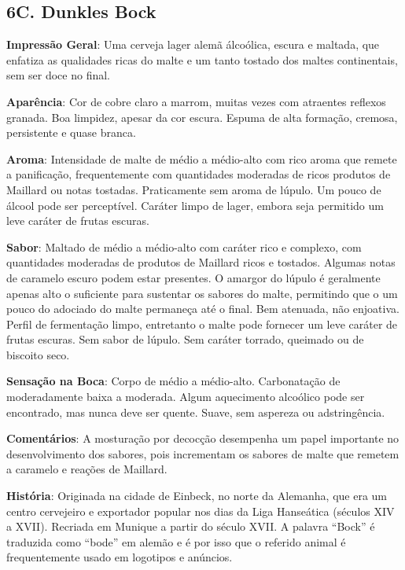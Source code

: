 \subsection*{6C. Dunkles Bock}

\textbf{Impressão Geral}: Uma cerveja lager alemã álcoólica, escura e maltada, que enfatiza as qualidades ricas do malte e um tanto tostado dos maltes continentais, sem ser doce no final.

\textbf{Aparência}: Cor de cobre claro a marrom, muitas vezes com atraentes reflexos granada. Boa limpidez, apesar da cor escura. Espuma de alta formação, cremosa, persistente e quase branca.

\textbf{Aroma}: Intensidade de malte de médio a médio-alto com rico aroma que remete a panificação, frequentemente com quantidades moderadas de ricos produtos de Maillard ou notas tostadas. Praticamente sem aroma de lúpulo. Um pouco de álcool pode ser perceptível. Caráter limpo de lager, embora seja permitido um leve caráter de frutas escuras.

\textbf{Sabor}: Maltado de médio a médio-alto com caráter rico e complexo, com quantidades moderadas de produtos de Maillard ricos e tostados. Algumas notas de caramelo escuro podem estar presentes. O amargor do lúpulo é geralmente apenas alto o suficiente para sustentar os sabores do malte, permitindo que o um pouco do adociado do malte permaneça até o final. Bem atenuada, não enjoativa. Perfil de fermentação limpo, entretanto o malte pode fornecer um leve caráter de frutas escuras. Sem sabor de lúpulo. Sem caráter torrado, queimado ou de biscoito seco.

\textbf{Sensação na Boca}: Corpo de médio a médio-alto. Carbonatação de moderadamente baixa a moderada. Algum aquecimento alcoólico pode ser encontrado, mas nunca deve ser quente. Suave, sem aspereza ou adstringência.

\textbf{Comentários}: A mosturação por decocção desempenha um papel importante no desenvolvimento dos sabores, pois incrementam os sabores de malte que remetem a caramelo e reações de Maillard.

\textbf{História}: Originada na cidade de Einbeck, no norte da Alemanha, que era um centro cervejeiro e exportador popular nos dias da Liga Hanseática (séculos XIV a XVII). Recriada em Munique a partir do século XVII. A palavra “Bock” é traduzida como “bode” em alemão e é por isso que o referido animal é frequentemente usado em logotipos e anúncios.

